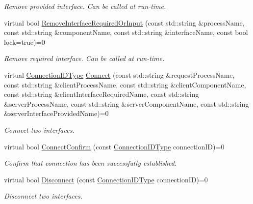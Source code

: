 \begin{DoxyCompactItemize}
\begin{DoxyCompactList}\small\item\em Remove provided interface. Can be called at run-\/time. \end{DoxyCompactList}\item 
virtual bool \hyperlink{classmts_manager_global_interface_a18793858afe244186f252669f7c6014a}{Remove\+Interface\+Required\+Or\+Input} (const std\+::string \&process\+Name, const std\+::string \&component\+Name, const std\+::string \&interface\+Name, const bool lock=true)=0
\begin{DoxyCompactList}\small\item\em Remove required interface. Can be called at run-\/time. \end{DoxyCompactList}\item 
virtual \hyperlink{mts_forward_declarations_8h_ad3543bb11742e1766374ec96016d6547}{Connection\+I\+D\+Type} \hyperlink{classmts_manager_global_interface_abdbf8e5366fd04e2e4cd6cac2328854c}{Connect} (const std\+::string \&request\+Process\+Name, const std\+::string \&client\+Process\+Name, const std\+::string \&client\+Component\+Name, const std\+::string \&client\+Interface\+Required\+Name, const std\+::string \&server\+Process\+Name, const std\+::string \&server\+Component\+Name, const std\+::string \&server\+Interface\+Provided\+Name)=0
\begin{DoxyCompactList}\small\item\em Connect two interfaces. \end{DoxyCompactList}\item 
virtual bool \hyperlink{classmts_manager_global_interface_a23e374c9329421f7e7e8989c5d19dee1}{Connect\+Confirm} (const \hyperlink{mts_forward_declarations_8h_ad3543bb11742e1766374ec96016d6547}{Connection\+I\+D\+Type} connection\+I\+D)=0
\begin{DoxyCompactList}\small\item\em Confirm that connection has been successfully established. \end{DoxyCompactList}\item 
virtual bool \hyperlink{classmts_manager_global_interface_a343048a7887e629f95b340ba0e821d6f}{Disconnect} (const \hyperlink{mts_forward_declarations_8h_ad3543bb11742e1766374ec96016d6547}{Connection\+I\+D\+Type} connection\+I\+D)=0
\begin{DoxyCompactList}\small\item\em Disconnect two interfaces. \end{DoxyCompactList}\item 

\end{DoxyCompactItemize}
